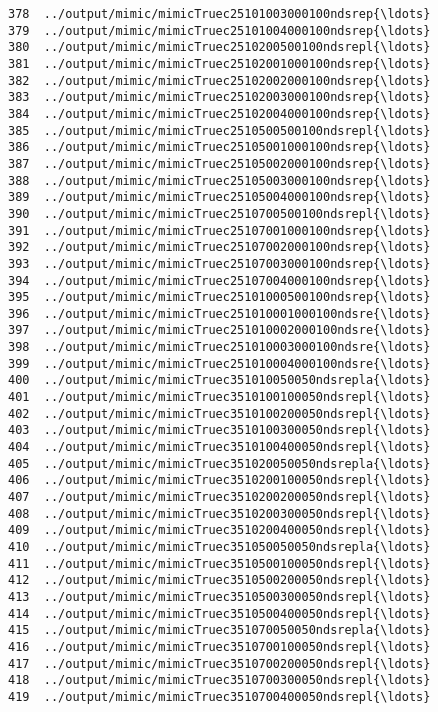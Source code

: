 \documentclass[11pt]{article}
\begin{document}
\begin{Verbatim}[commandchars=\\\{\}]
378  ../output/mimic/mimicTruec25101003000100ndsrep{\ldots}  
379  ../output/mimic/mimicTruec25101004000100ndsrep{\ldots}  
380  ../output/mimic/mimicTruec2510200500100ndsrepl{\ldots}  
381  ../output/mimic/mimicTruec25102001000100ndsrep{\ldots}  
382  ../output/mimic/mimicTruec25102002000100ndsrep{\ldots}  
383  ../output/mimic/mimicTruec25102003000100ndsrep{\ldots}  
384  ../output/mimic/mimicTruec25102004000100ndsrep{\ldots}  
385  ../output/mimic/mimicTruec2510500500100ndsrepl{\ldots}  
386  ../output/mimic/mimicTruec25105001000100ndsrep{\ldots}  
387  ../output/mimic/mimicTruec25105002000100ndsrep{\ldots}  
388  ../output/mimic/mimicTruec25105003000100ndsrep{\ldots}  
389  ../output/mimic/mimicTruec25105004000100ndsrep{\ldots}  
390  ../output/mimic/mimicTruec2510700500100ndsrepl{\ldots}  
391  ../output/mimic/mimicTruec25107001000100ndsrep{\ldots}  
392  ../output/mimic/mimicTruec25107002000100ndsrep{\ldots}  
393  ../output/mimic/mimicTruec25107003000100ndsrep{\ldots}  
394  ../output/mimic/mimicTruec25107004000100ndsrep{\ldots}  
395  ../output/mimic/mimicTruec25101000500100ndsrep{\ldots}  
396  ../output/mimic/mimicTruec251010001000100ndsre{\ldots}  
397  ../output/mimic/mimicTruec251010002000100ndsre{\ldots}  
398  ../output/mimic/mimicTruec251010003000100ndsre{\ldots}  
399  ../output/mimic/mimicTruec251010004000100ndsre{\ldots}  
400  ../output/mimic/mimicTruec351010050050ndsrepla{\ldots}  
401  ../output/mimic/mimicTruec3510100100050ndsrepl{\ldots}  
402  ../output/mimic/mimicTruec3510100200050ndsrepl{\ldots}  
403  ../output/mimic/mimicTruec3510100300050ndsrepl{\ldots}  
404  ../output/mimic/mimicTruec3510100400050ndsrepl{\ldots}  
405  ../output/mimic/mimicTruec351020050050ndsrepla{\ldots}  
406  ../output/mimic/mimicTruec3510200100050ndsrepl{\ldots}  
407  ../output/mimic/mimicTruec3510200200050ndsrepl{\ldots}  
408  ../output/mimic/mimicTruec3510200300050ndsrepl{\ldots}  
409  ../output/mimic/mimicTruec3510200400050ndsrepl{\ldots}  
410  ../output/mimic/mimicTruec351050050050ndsrepla{\ldots}  
411  ../output/mimic/mimicTruec3510500100050ndsrepl{\ldots}  
412  ../output/mimic/mimicTruec3510500200050ndsrepl{\ldots}  
413  ../output/mimic/mimicTruec3510500300050ndsrepl{\ldots}  
414  ../output/mimic/mimicTruec3510500400050ndsrepl{\ldots}  
415  ../output/mimic/mimicTruec351070050050ndsrepla{\ldots}  
416  ../output/mimic/mimicTruec3510700100050ndsrepl{\ldots}  
417  ../output/mimic/mimicTruec3510700200050ndsrepl{\ldots}  
418  ../output/mimic/mimicTruec3510700300050ndsrepl{\ldots}  
419  ../output/mimic/mimicTruec3510700400050ndsrepl{\ldots}  

\end{Verbatim}
\end{document}
